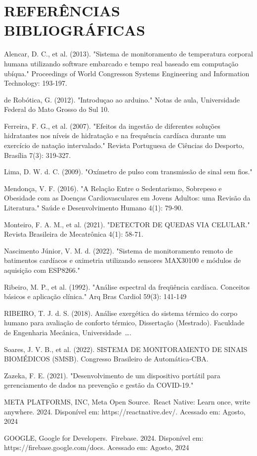 \section*{REFERÊNCIAS BIBLIOGRÁFICAS}



\noindent Alencar, D. C., et al. (2013). "Sistema de monitoramento de temperatura corporal humana utilizando software embarcado e tempo real baseado em computação ubíqua." Proceedings of World Congresson Systems Engineering and Information Technology: 193-197.


\singlespacing
\noindent de Robótica, G. (2012). "Introduçao ao arduino." Notas de aula, Universidade Federal do Mato Grosso do Sul 10.

\singlespacing
\noindent Ferreira, F. G., et al. (2007). "Efeitos da ingestão de diferentes soluções hidratantes nos níveis de hidratação e na frequência cardíaca durante um exercício de natação intervalado." Revista Portuguesa de Ciências do Desporto, Brasília 7(3): 319-327.


\singlespacing
\noindent Lima, D. W. d. C. (2009). "Oxímetro de pulso com transmissão de sinal sem fios."


\singlespacing
\noindent Mendonça, V. F. (2016). "A Relação Entre o Sedentarismo, Sobrepeso e Obesidade com as Doenças Cardiovasculares em Jovens Adultos: uma Revisão da Literatura." Saúde e Desenvolvimento Humano 4(1): 79-90.


\singlespacing
\noindent Monteiro, F. A. M., et al. (2021). "DETECTOR DE QUEDAS VIA CELULAR." Revista Brasileira de Mecatrônica 4(1): 58-71.


\singlespacing
\noindent Nascimento Júnior, V. M. d. (2022). "Sistema de monitoramento remoto de batimentos cardíacos e oximetria utilizando sensores MAX30100 e módulos de aquisição com ESP8266."


\singlespacing
\noindent Ribeiro, M. P., et al. (1992). "Análise espectral da freqüência cardíaca. Conceitos básicos e aplicação clínica." Arq Bras Cardiol 59(3): 141-149


\singlespacing
\noindent RIBEIRO, T. J. d. S. (2018). Análise exergética do sistema térmico do corpo humano para avaliação de conforto térmico, Dissertação (Mestrado). Faculdade de Engenharia Mecânica, Universidade ….


\singlespacing
\noindent Soares, J. V. B., et al. (2022). SISTEMA DE MONITORAMENTO DE SINAIS BIOMÉDICOS (SMSB). Congresso Brasileiro de Automática-CBA.


\singlespacing
\noindent Zazeka, F. E. (2021). "Desenvolvimento de um dispositivo portátil para gerenciamento de dados na prevenção e gestão da COVID-19."


\singlespacing
\noindent META PLATFORMS, INC, Meta Open Source. React Native: Learn once, write anywhere. 2024. Disponível em: https://reactnative.dev/. Acessado em: Agosto, 2024


\singlespacing
\noindent GOOGLE, Google for Developers. Firebase. 2024. Disponível em: https://firebase.google.com/docs. Acessado em: Agosto, 2024
